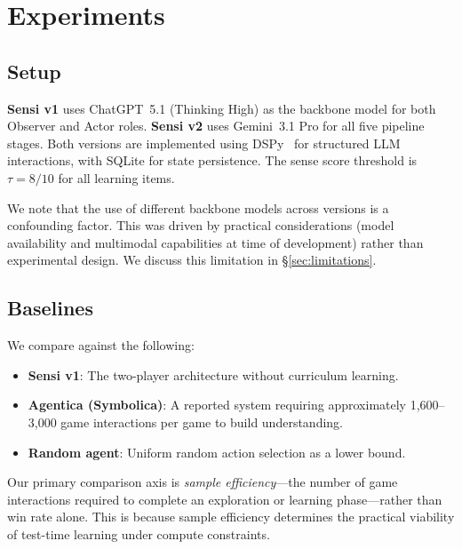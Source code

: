 \documentclass[11pt,letterpaper]{article}
\begin{document}
\section{Experiments}
\label{sec:experiments}

\subsection{Setup}

\textbf{Sensi v1} uses ChatGPT~5.1 (Thinking High) as the backbone model for both Observer and Actor roles. \textbf{Sensi v2} uses Gemini~3.1 Pro for all five pipeline stages. Both versions are implemented using DSPy~\citep{khattab2023dspy} for structured LLM interactions, with SQLite for state persistence. The sense score threshold is $\tau = 8/10$ for all learning items.

We note that the use of different backbone models across versions is a confounding factor. This was driven by practical considerations (model availability and multimodal capabilities at time of development) rather than experimental design. We discuss this limitation in \S\ref{sec:limitations}.

\subsection{Baselines}

We compare against the following:
\begin{itemize}[leftmargin=2em]
  \item \textbf{Sensi v1}: The two-player architecture without curriculum learning.
  \item \textbf{Agentica (Symbolica)}: A reported system requiring approximately 1,600--3,000 game interactions per game to build understanding.
  \item \textbf{Random agent}: Uniform random action selection as a lower bound.
\end{itemize}

Our primary comparison axis is \emph{sample efficiency}---the number of game interactions required to complete an exploration or learning phase---rather than win rate alone. This is because sample efficiency determines the practical viability of test-time learning under compute constraints.
\end{document}
